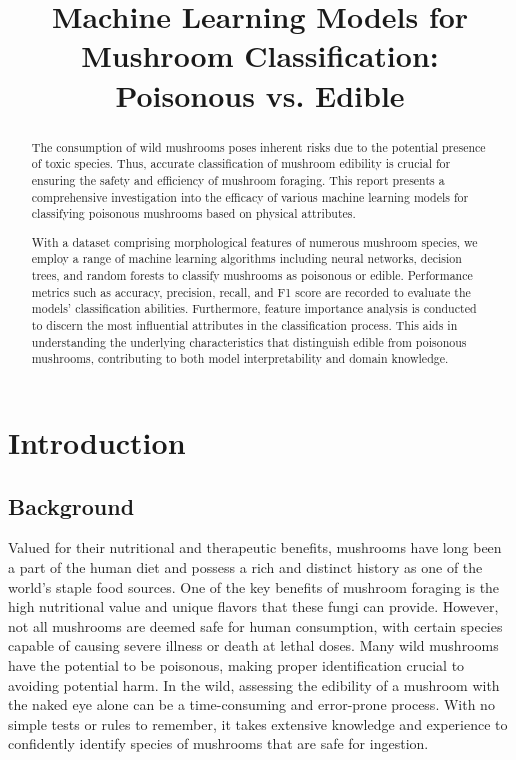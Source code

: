 \documentclass[11pt, conference]{IEEEtran}
\begin{document}
\title{Machine Learning Models for Mushroom Classification: Poisonous vs. Edible}
\author{
    \IEEEauthorblockA{}
    \and
    \IEEEauthorblockA{}
    \and
    \IEEEauthorblockA{}
    \and
    \IEEEauthorblockA{}
}

\maketitle
\begin{abstract}
    The consumption of wild mushrooms poses inherent risks due to the potential presence of toxic species. Thus, accurate classification of mushroom edibility is crucial for ensuring the safety and efficiency of mushroom foraging. This report presents a comprehensive investigation into the efficacy of various machine learning models for classifying poisonous mushrooms based on physical attributes.
    
    With a dataset comprising morphological features of numerous mushroom species, we employ a range of machine learning algorithms including neural networks, decision trees, and random forests to classify mushrooms as poisonous or edible. Performance metrics such as accuracy, precision, recall, and F1 score are recorded to evaluate the models' classification abilities. Furthermore, feature importance analysis is conducted to discern the most influential attributes in the classification process. This aids in understanding the underlying characteristics that distinguish edible from poisonous mushrooms, contributing to both model interpretability and domain knowledge.
\end{abstract}

\section{Introduction}
    \subsection{Background}
    Valued for their nutritional and therapeutic benefits, mushrooms have long been a part of the human diet and possess a rich and distinct history as one of the world's staple food sources. One of the key benefits of mushroom foraging is the high nutritional value and unique flavors that these fungi can provide. However, not all mushrooms are deemed safe for human consumption, with certain species capable of causing severe illness or death at lethal doses. Many wild mushrooms have the potential to be poisonous, making proper identification crucial to avoiding potential harm. In the wild, assessing the edibility of a mushroom with the naked eye alone can be a time-consuming and error-prone process. With no simple tests or rules to remember, it takes extensive knowledge and experience to confidently identify species of mushrooms that are safe for ingestion.
\end{document}
